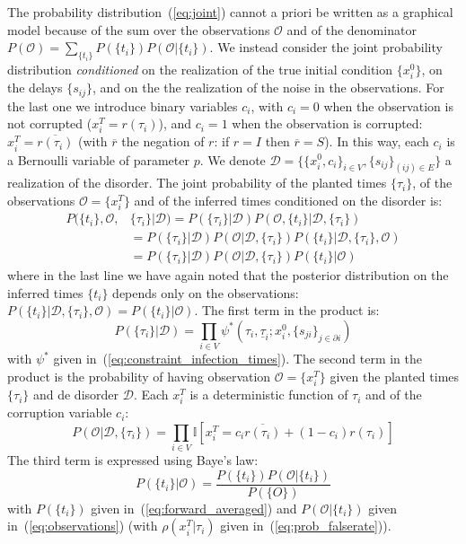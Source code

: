 \documentclass[a4paper, amsfonts, amssymb, amsmath, reprint, showkeys, nofootinbib, twoside, floatfix, pre,superscriptaddress]{revtex4-2}
\begin{document}
The probability distribution~(\ref{eq:joint}) cannot a priori be written as a graphical model because of the sum over the observations $\mathcal{O}$ and of the denominator $P(\mathcal{O})=\sum_{\{t_i\}}P(\{t_i\})P(\mathcal{O}|\{t_i\})$. 
We instead consider the joint probability distribution {\it conditioned} on the realization of the true initial condition $\{x_i^0\}$, on the delays $\{s_{ij}\}$, and on the the realization of the noise in the observations. For the last one we introduce binary variables $c_i$, with $c_i=0$ when the observation is not corrupted ($x_i^T=r(\tau_i)$), and $c_i=1$ when the observation is corrupted: $x_i^T=\overline{r(\tau_i)}$ (with $\overline{r}$ the negation of $r$: if $r=I$ then $\overline{r}=S$). In this way, each $c_i$ is a Bernoulli variable of parameter $p$.
We denote $\mathcal{D}=\{\{x_i^0, c_i\}_{i\in V}, \{s_{ij}\}_{(ij)\in E}\}$ a realization of the disorder.
The joint probability of the planted times $\{\tau_i\}$, of the observations $\mathcal{O}=\{x_i^T\}$ and of the inferred times conditioned on the disorder is:
\begin{align*}
	P(\{t_i\},\mathcal{O},&\{\tau_i\}|\mathcal{D}) = P(\{\tau_i\}|\mathcal{D})P(\mathcal{O}, \{t_i\}|\mathcal{D},\{\tau_i\}) \\
	&=P(\{\tau_i\}|\mathcal{D})P(\mathcal{O}|\mathcal{D},\{\tau_i\})P(\{t_i\}|\mathcal{D},\{\tau_i\}, \mathcal{O})\\
	&=P(\{\tau_i\}|\mathcal{D})P(\mathcal{O}|\mathcal{D},\{\tau_i\})P(\{t_i\}|\mathcal{O})
\end{align*}
where in the last line we have again noted that the posterior distribution on the inferred times $\{t_i\}$ depends only on the observations: $P(\{t_i\}|\mathcal{D},\{\tau_i\}, \mathcal{O})=P(\{t_i\}|\mathcal{O})$.
The first term in the product is:
$$
	P(\{\tau_i\}|\mathcal{D})=\prod_{i\in V}\psi^*(\tau_i, \underline{\tau}_i;x_i^0, \{s_{ji}\}_{j\in\partial i})
$$
with $\psi^*$ given in~(\ref{eq:constraint_infection_times}).
The second term in the product is the probability of having observation $\mathcal{O}=\{x_i^T\}$ given the planted times $\{\tau_i\}$ and de disorder $\mathcal{D}$. Each $x_i^T$ is a deterministic function of $\tau_i$ and of the corruption variable $c_i$:
$$
	P(\mathcal{O}|\mathcal{D},\{\tau_i\}) = \prod_{i\in V}\mathbb{I}[x_i^T=c_i\overline{r(\tau_i)}+(1-c_i)r(\tau_i)]
$$
The third term is expressed using Baye's law:
$$
	P(\{t_i\}|\mathcal{O})=\frac{P(\{t_i\})P(\mathcal{O}|\{t_i\})}{P(\{O\})}
$$
with $P(\{t_i\})$ given in~(\ref{eq:forward_averaged}) and $P(\mathcal{O}|\{t_i\})$ given in~(\ref{eq:observations}) (with $\rho(x_i^T|\tau_i)$ given in~(\ref{eq:prob_falserate})).
\end{document}

